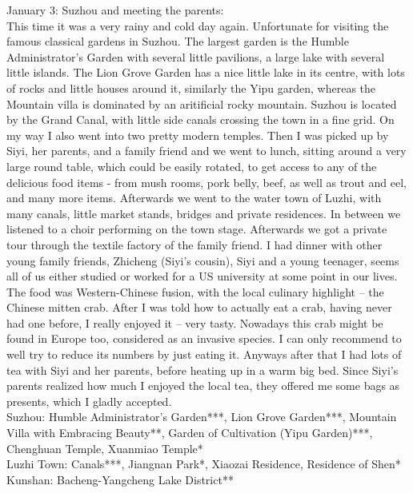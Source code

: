 January 3: Suzhou and meeting the parents:\\
This time it was a very rainy and cold day again. Unfortunate for visiting the famous classical gardens in Suzhou. The largest garden is the Humble Administrator's Garden with several little pavilions, a large lake with several little islands. The Lion Grove Garden has a nice little lake in its centre, with lots of rocks and little houses around it, similarly the Yipu garden, whereas the Mountain villa is dominated by an aritificial rocky mountain. Suzhou is located by the Grand Canal, with little side canals crossing the town in a fine grid. On my way I also went into two pretty modern temples. Then I was picked up by Siyi, her parents, and a family friend and we went to lunch, sitting around a very large round table, which could be easily rotated, to get access to any of the delicious food items - from mush rooms, pork belly, beef, as well as trout and eel, and many more items. Afterwards we went to the water town of Luzhi, with many canals, little market stands, bridges and private residences. In between we listened to a choir performing on the town stage. Afterwards we got a private tour through the textile factory of the family friend. I had dinner with other young family friends, Zhicheng (Siyi's cousin), Siyi and a young teenager, seems all of us either studied or worked for a US university at some point in our lives. The food was Western-Chinese fusion, with the local culinary highlight -- the Chinese mitten crab. After I was told how to actually eat a crab, having never had one before, I really enjoyed it -- very tasty. Nowadays this crab might be found in Europe too, considered as an invasive species. I can only recommend to well try to reduce its numbers by just eating it. Anyways after that I had lots of tea with Siyi and her parents, before heating up in a warm big bed. Since Siyi's parents realized how much I enjoyed the local tea, they offered me some bags as presents, which I gladly accepted.\\

Suzhou: Humble Administrator's Garden***, Lion Grove Garden***, Mountain Villa with Embracing Beauty**, Garden of Cultivation (Yipu Garden)***, Chenghuan Temple, Xuanmiao Temple*\\
Luzhi Town: Canals***, Jiangnan Park*, Xiaozai Residence, Residence of Shen*\\
Kunshan: Bacheng-Yangcheng Lake District**\\

